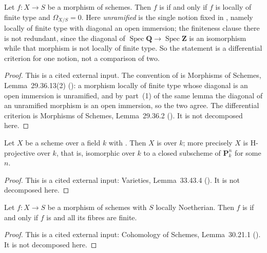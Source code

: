 \begin{lemma}
\label{lem:pcb-unramified-omega-zero}
Let \(f:X\to S\) be a morphism of schemes.  Then \(f\) is
 if and only if \(f\) is
locally of finite type and \(\Omega_{X/S}=0\).  Here \emph{unramified}
is the single notion fixed in , namely
locally of finite type with diagonal an open immersion; the finiteness
clause there is not redundant, since the diagonal of
\(\operatorname{Spec}\mathbf Q\to\operatorname{Spec}\mathbf Z\) is an
isomorphism while that morphism is not locally of finite type.  So the
statement is a differential criterion for one notion, not a comparison
of two.
\end{lemma}
\begin{proof}
This is a cited external input.  The convention of
 is Morphisms of Schemes,
Lemma~29.36.13(2) (): a morphism locally of finite
type whose diagonal is an open immersion is unramified, and by
part~(1) of the same lemma the diagonal of an unramified morphism is an
open immersion, so the two agree.  The differential criterion is
Morphisms of Schemes, Lemma~29.36.2 ().  It is not
decomposed here.
\end{proof}

\begin{lemma}
\label{lem:pcb-proper-dim-one-projective}
Let \(X\) be a scheme 
over a field \(k\) with .
Then \(X\) is 
over \(k\); more precisely \(X\) is H-projective over \(k\), that is,
isomorphic over \(k\) to a closed subscheme of \(\mathbf P^n_k\) for
some \(n\).
\end{lemma}
\begin{proof}
This is a cited external input: Varieties, Lemma~33.43.4
().  It is not decomposed here.
\end{proof}

\begin{lemma}
\label{lem:pcb-finite-iff-proper-finite-fibres}
Let \(f:X\to S\) be a morphism of schemes with \(S\) locally
Noetherian.  Then \(f\) is 
if and only if \(f\) is 
and all its fibres are finite.
\end{lemma}
\begin{proof}
This is a cited external input: Cohomology of Schemes, Lemma~30.21.1
().  It is not decomposed here.
\end{proof}

